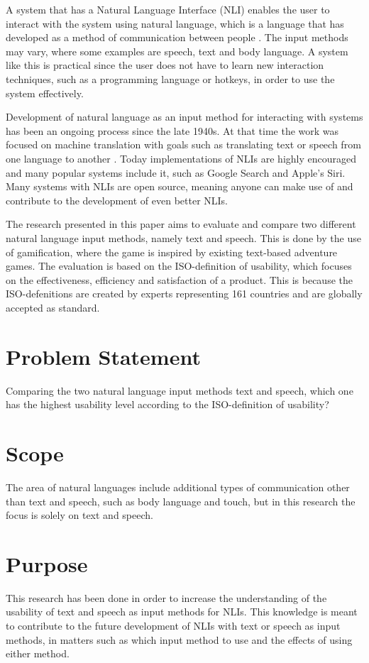 A system that has a Natural Language Interface (NLI) enables the user to interact with the system using natural language, which is a language that has developed as a method of communication between people \citep{NatLan}. The input methods may vary, where some examples are speech, text and body language. A system like this is practical since the user does not have to learn new interaction techniques, such as a programming language or hotkeys, in order to use the system effectively.

Development of natural language as an input method for interacting with systems has been an ongoing process since the late 1940s. At that time the work was focused on machine translation with goals such as translating text or speech from one language to another \citep{Jones}. Today implementations of NLIs are highly encouraged and many popular systems include it, such as Google Search and Apple's Siri. Many systems with NLIs are open source, meaning anyone can make use of and contribute to the development of even better NLIs.

The research presented in this paper aims to evaluate and compare two different natural language input methods, namely text and speech. This is done by the use of gamification, where the game is inspired by existing text-based adventure games. The evaluation is based on the ISO-definition of usability, which focuses on the effectiveness, efficiency and satisfaction of a product. \citep{ISO} This is because the ISO-defenitions are created by experts representing 161 countries and are globally accepted as standard.

\section{Problem Statement}
Comparing the two natural language input methods text and speech, which one has the highest usability level according to the ISO-definition of usability?

\section{Scope}
The area of natural languages include additional types of communication other than text and speech, such as body language and touch, but in this research the focus is solely on text and speech.

\section{Purpose}
This research has been done in order to increase the understanding of the usability of text and speech as input methods for NLIs. This knowledge is meant to contribute to the future development of NLIs with text or speech as input methods, in matters such as which input method to use and the effects of using either method.

